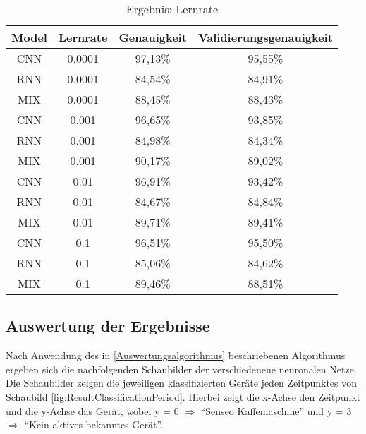         \begin{table}[H]
            \centering
            \begin{tabular}{|c|c|c|c|}
                \hline
                Model & Lernrate & Genauigkeit & Validierungsgenauigkeit \\
                \hline
                CNN & 0.0001 & 97,13\% & 95,55\% \\
                \hline
                RNN & 0.0001 & 84,54\% & 84,91\% \\
                \hline
                MIX & 0.0001 & 88,45\% & 88,43\% \\
                \hline
                \hline
                CNN & 0.001  & 96,65\% & 93,85\% \\
                \hline
                RNN & 0.001  & 84,98\% & 84,34\% \\
                \hline
                MIX & 0.001  & 90,17\% & 89,02\% \\
                \hline
                \hline
                CNN & 0.01   & 96,91\% & 93,42\% \\
                \hline
                RNN & 0.01   & 84,67\% & 84,84\% \\
                \hline
                MIX & 0.01   & 89,71\% & 89,41\% \\
                \hline
                \hline
                CNN & 0.1    & 96,51\% & 95,50\% \\
                \hline
                RNN & 0.1    & 85,06\% & 84,62\% \\
                \hline
                MIX & 0.1    & 89,46\% & 88,51\% \\
                \hline
            \end{tabular}
            \caption{Ergebnis: Lernrate}
            \label{tabl:ErgebnisLernrate}
        \end{table}   


    \subsection{Auswertung der Ergebnisse}

        Nach Anwendung des in \ref{Auswertungsalgorithmus} beschriebenen Algorithmus ergeben sich die nachfolgenden Schaubilder der verschiedenene neuronalen Netze.
        Die Schaubilder zeigen die jeweiligen klassifizierten Geräte jeden Zeitpunktes von Schaubild \ref{fig:ResultClassificationPeriod}.
        Hierbei zeigt die x-Achse den Zeitpunkt und die y-Achse das Gerät, wobei y = 0 \( \Rightarrow \)  "`Senseo Kaffemaschine"' und y = 3 \( \Rightarrow \) "`Kein aktives bekanntes Gerät"'.
        
